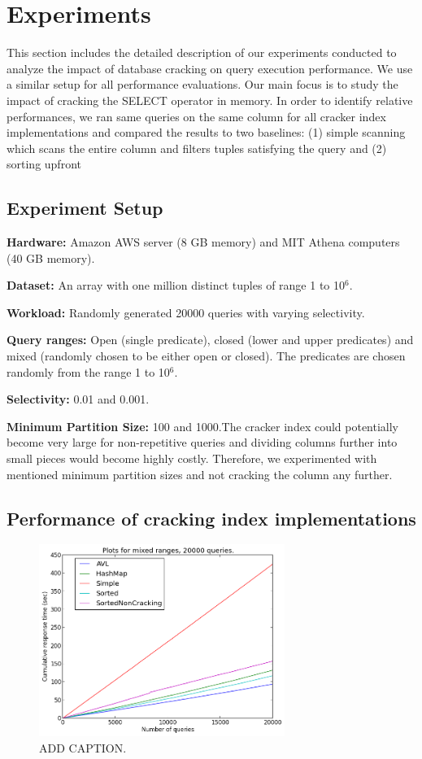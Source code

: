 \section{Experiments}
This section includes the detailed description of our experiments conducted to analyze the impact of database cracking on query execution performance. We use a similar setup for all performance evaluations. Our main focus is to study the impact of cracking the SELECT operator in memory. In order to identify relative performances, we ran same queries on the same column for all cracker index implementations and compared the results to two baselines: (1) simple scanning which scans the entire column and filters tuples satisfying the query and (2) sorting upfront 

\subsection{Experiment Setup}

\textbf{Hardware:} Amazon AWS server (8 GB memory) and MIT Athena computers (40 GB memory). 

\textbf{Dataset:} An array with one million distinct tuples of range 1 to 10${^6}$. 

\textbf{Workload:} Randomly generated 20000 queries with varying selectivity.

\textbf{Query ranges:} Open (single predicate), closed (lower and upper predicates) and mixed (randomly chosen to be either open or closed).
The predicates are chosen randomly from the range 1 to 10${^6}$.

\textbf{Selectivity:} 0.01 and 0.001. 

\textbf{Minimum Partition Size: } 100 and 1000.The cracker index could potentially become very large for non-repetitive queries and dividing columns further into small pieces would become highly costly. Therefore, we experimented with mentioned minimum partition sizes and not cracking the column any further.
\subsection{Performance of cracking index implementations}

\begin{figure}[h]
\includegraphics[width=8cm]{figures/mixed20000}
\caption{ADD CAPTION.}
\label{fig:mixed20000}
\end{figure}

